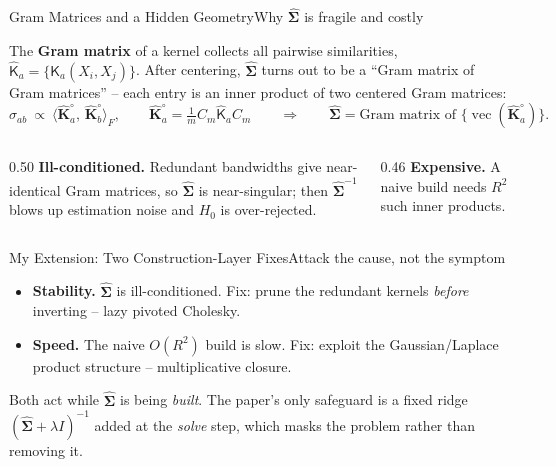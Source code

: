 \documentclass[aspectratio=169,10pt]{beamer}
\newcommand{\pos}[1]{\textcolor{fudanblue}{#1}}
\newcommand{\warn}[1]{\textcolor{accentorange}{#1}}
\newcommand{\HL}[1]{\textcolor{accentgreen}{#1}}
\newcommand{\sfK}{\mathsf{K}}                      %
\newcommand{\Sig}{\hat{\boldsymbol{\Sigma}}}        %
\newcommand{\Kcg}{\hat{\mathbf{K}}^{\circ}}         %
\begin{document}
\begin{frame}{Gram Matrices and a Hidden Geometry}{Why $\Sig$ is fragile and costly}

\vspace{0.04cm}
The \textbf{Gram matrix} of a kernel collects all pairwise similarities,
$\hat{\sfK}_a=\{\sfK_a(X_i,X_j)\}$. After centering, $\Sig$ turns out to be a
``Gram matrix of Gram matrices'' -- each entry is an inner product of two centered
Gram matrices:
\[
  \hat\sigma_{ab}\ \propto\ \big\langle \Kcg_a,\,\Kcg_b\big\rangle_F,
  \qquad \Kcg_a=\tfrac1m C_m\hat{\sfK}_aC_m
  \qquad\Longrightarrow\qquad
  \Sig=\text{Gram matrix of }\{\operatorname{vec}(\Kcg_a)\}.
\]

\vspace{0.18cm}
\begin{columns}[T,totalwidth=\linewidth]
\begin{column}{0.50\linewidth}
\textbf{\warn{Ill-conditioned.}} Redundant bandwidths give near-identical Gram matrices,
so $\Sig$ is near-singular; then $\Sig^{-1}$ blows up estimation noise and $H_0$ is
over-rejected.
\end{column}
\begin{column}{0.46\linewidth}
\textbf{\warn{Expensive.}} A naive build needs $R^2$ such inner products.
\end{column}
\end{columns}

\end{frame}

\begin{frame}{My Extension: Two Construction-Layer Fixes}{Attack the cause, not the symptom}

\vspace{0.18cm}
\begin{itemize}\setlength\itemsep{0.45cm}
  \item \textbf{\pos{Stability.}} $\Sig$ is ill-conditioned. \HL{Fix:} prune the redundant
        kernels \emph{before} inverting -- lazy pivoted Cholesky.
  \item \textbf{\pos{Speed.}} The naive $O(R^2)$ build is slow. \HL{Fix:} exploit the
        Gaussian/Laplace product structure -- multiplicative closure.
\end{itemize}

\vspace{0.35cm}
Both act while $\Sig$ is being \emph{built}. The paper's only safeguard is a fixed ridge
$(\Sig+\lambda I)^{-1}$ added at the \emph{solve} step, which masks the problem rather than
removing it.

\end{frame}
\end{document}
